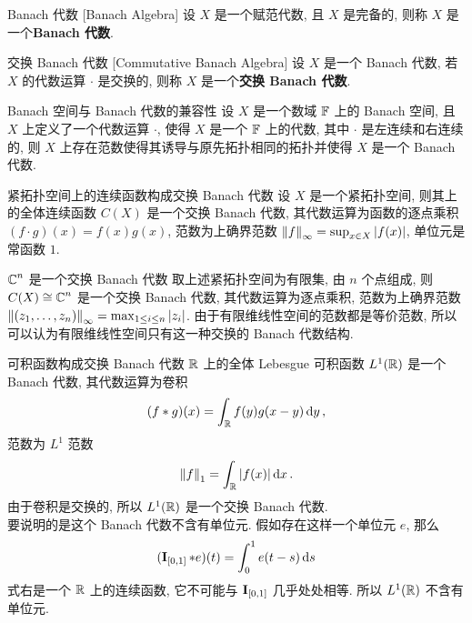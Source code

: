         \begin{dfn}
            {Banach 代数}
            [Banach Algebra]
            设 \(X\) 是一个赋范代数, 且 \(X\) 是完备的, 则称 \(X\) 是一个\textbf{Banach 代数}.
        \end{dfn}

        \begin{dfn}
            {交换 Banach 代数}
            [Commutative Banach Algebra]
            设 \(X\) 是一个 Banach 代数, 若 \(X\) 的代数运算 \(\cdot\) 是交换的, 则称 \(X\) 是一个\textbf{交换 Banach 代数}.
        \end{dfn}

        \begin{thm}
            {Banach 空间与 Banach 代数的兼容性}
            设 \(X\) 是一个数域 \(\operatorname{\mathbb{F}}\) 上的 Banach 空间, 且 \(X\) 上定义了一个代数运算 \(\cdot\), 使得 \(X\) 是一个 \(\operatorname{\mathbb{F}}\) 上的代数, 其中 \(\cdot\) 是左连续和右连续的, 则 \(X\) 上存在范数使得其诱导与原先拓扑相同的拓扑并使得 \(X\) 是一个 Banach 代数.
        \end{thm}

        \begin{ins}
            {紧拓扑空间上的连续函数构成交换 Banach 代数}
            设 \(X\) 是一个紧拓扑空间, 则其上的全体连续函数 \(C(X)\) 是一个交换 Banach 代数, 其代数运算为函数的逐点乘积 \((f\cdot g)(x)=f(x)g(x)\), 范数为上确界范数 \(\norm{f}_\infty = \sup_{x\in X}\abs{f(x)}\), 单位元是常函数 \(1\).
        \end{ins}

        \begin{ins}
            {\(\operatorname{\mathbb{C}}^n\) 是一个交换 Banach 代数}
            取上述紧拓扑空间为有限集, 由 \(n\) 个点组成, 则 \(C(X)\cong\operatorname{\mathbb{C}}^n\) 是一个交换 Banach 代数, 其代数运算为逐点乘积, 范数为上确界范数 \(\norm{(z_1,\ldots,z_n)}_\infty = \max_{1\leq i\leq n}\abs{z_i}\). 由于有限维线性空间的范数都是等价范数, 所以可以认为有限维线性空间只有这一种交换的 Banach 代数结构.
        \end{ins}

        \begin{ins}
            {可积函数构成交换 Banach 代数}
            \(\operatorname{\mathbb{R}}\) 上的全体 Lebesgue 可积函数 \(L^1(\operatorname{\mathbb{R}})\) 是一个 Banach 代数, 其代数运算为卷积 
            \[(f\ast g)(x)=\int_{\operatorname{\mathbb{R}}} f(y)g(x-y)\dd{y},\] 
            范数为 \(L^1\) 范数 
            \[\norm{f}_1 = \int_{\operatorname{\mathbb{R}}} \abs{f(x)}\dd{x}.\]
            由于卷积是交换的, 所以 \(L^1(\operatorname{\mathbb{R}})\) 是一个交换 Banach 代数. \\
            要说明的是这个 Banach 代数不含有单位元. 假如存在这样一个单位元 \(e\), 那么
            \[(\operatorname{\mathbf{I}}_{[0,1]}\ast e) (t) = \int_0^1 e(t-s)\dd{s}\]
            式右是一个 \(\operatorname{\mathbb{R}}\) 上的连续函数, 它不可能与 \(\operatorname{\mathbf{I}}_{[0,1]}\) 几乎处处相等. 所以 \(L^1(\operatorname{\mathbb{R}})\) 不含有单位元.
        \end{ins}

